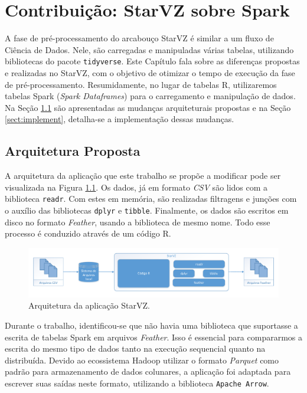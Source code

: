 \chapter{Contribuição: StarVZ sobre Spark} \label{ch:contribution}

A fase de pré-processamento do arcabouço StarVZ é similar a um fluxo de Ciência 
de Dados. Nele, são carregadas e manipuladas várias tabelas, utilizando 
bibliotecas do pacote \texttt{tidyverse}. Este Capítulo fala sobre as diferenças 
propostas e realizadas no StarVZ, com o objetivo de otimizar o tempo de 
execução da fase de pré-processamento. Resumidamente, no lugar de tabelas R, 
utilizaremos tabelas Spark (\emph{Spark Dataframes}) para o carregamento e 
manipulação de dados. Na Seção \ref{sect:arch} são apresentadas as mudanças 
arquiteturais propostas e na Seção \ref{sect:implement}, detalha-se a 
implementação dessas mudanças.

\section{Arquitetura Proposta} \label{sect:arch}

A arquitetura da aplicação que este trabalho se propõe a modificar pode ser 
visualizada na Figura \ref{fig:starvz-app}. Os dados, já em formato 
\textit{CSV} são lidos com a biblioteca \texttt{readr}. Com estes em memória, 
são realizadas filtragens e junções com o auxílio das bibliotecas \texttt{dplyr} 
e \texttt{tibble}. Finalmente, os dados são escritos em disco no formato 
\textit{Feather}, usando a biblioteca de mesmo nome. Todo esse processo é 
conduzido através de um código R.

\begin{figure}[ht]
 \centerline{\includegraphics[width=1\textwidth]{./img/starvz-arch.pdf}}
 \caption{Arquitetura da aplicação StarVZ.}
 \label{fig:starvz-app}
\end{figure}

Durante o trabalho, identificou-se que não havia uma biblioteca que suportasse a 
escrita de tabelas Spark em arquivos \textit{Feather}. Isso é essencial para 
compararmos a escrita do mesmo tipo de dados tanto na execução sequencial quanto 
na distribuída. Devido ao ecossistema Hadoop utilizar o formato \textit{Parquet} 
\cite{ref:parquet} como padrão para armazenamento de dados colunares, a 
aplicação foi adaptada para escrever suas saídas neste formato, utilizando a 
biblioteca \texttt{Apache Arrow}.

